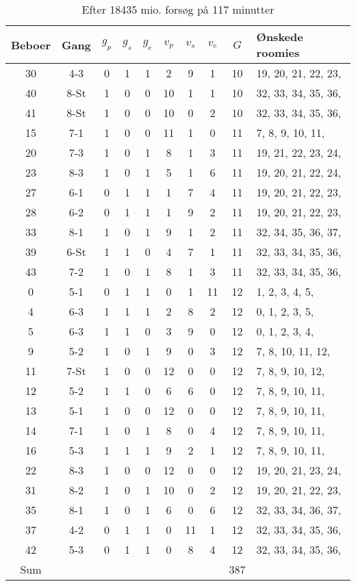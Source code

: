 \documentclass[article,oneside,11pt,a4paper]{memoir}
\newenvironment{assignment}[1]{
\begin{table}[h]
\caption{#1}
\footnotesize
\begin{center}
\begin{tabular}{cccccccccl}
\toprule
Beboer & Gang & $g_p$ & $g_s$ & $g_e$ & $v_p$ & $v_s$ & $v_e$ & $G$ & Ønskede roomies \\ \midrule
}{
\bottomrule
\end{tabular}
\end{center}
\end{table}

}
\begin{document}
\begin{assignment}{Efter 18435 mio. forsøg på 117 minutter}
    30 & 4-3  &   0 &   1 &   1 &   2 &   9 &   1 & 10 &  19, 20, 21, 22, 23, \\
    40 & 8-St &   1 &   0 &   0 &  10 &   1 &   1 & 10 &  32, 33, 34, 35, 36, \\
    41 & 8-St &   1 &   0 &   0 &  10 &   0 &   2 & 10 &  32, 33, 34, 35, 36, \\
    15 & 7-1  &   1 &   0 &   0 &  11 &   1 &   0 & 11 &   7,  8,  9, 10, 11, \\
    20 & 7-3  &   1 &   0 &   1 &   8 &   1 &   3 & 11 &  19, 21, 22, 23, 24, \\
    23 & 8-3  &   1 &   0 &   1 &   5 &   1 &   6 & 11 &  19, 20, 21, 22, 24, \\
    27 & 6-1  &   0 &   1 &   1 &   1 &   7 &   4 & 11 &  19, 20, 21, 22, 23, \\
    28 & 6-2  &   0 &   1 &   1 &   1 &   9 &   2 & 11 &  19, 20, 21, 22, 23, \\
    33 & 8-1  &   1 &   0 &   1 &   9 &   1 &   2 & 11 &  32, 34, 35, 36, 37, \\
    39 & 6-St &   1 &   1 &   0 &   4 &   7 &   1 & 11 &  32, 33, 34, 35, 36, \\
    43 & 7-2  &   1 &   0 &   1 &   8 &   1 &   3 & 11 &  32, 33, 34, 35, 36, \\
     0 & 5-1  &   0 &   1 &   1 &   0 &   1 &  11 & 12 &   1,  2,  3,  4,  5, \\
     4 & 6-3  &   1 &   1 &   1 &   2 &   8 &   2 & 12 &   0,  1,  2,  3,  5, \\
     5 & 6-3  &   1 &   1 &   0 &   3 &   9 &   0 & 12 &   0,  1,  2,  3,  4, \\
     9 & 5-2  &   1 &   0 &   1 &   9 &   0 &   3 & 12 &   7,  8, 10, 11, 12, \\
    11 & 7-St &   1 &   0 &   0 &  12 &   0 &   0 & 12 &   7,  8,  9, 10, 12, \\
    12 & 5-2  &   1 &   1 &   0 &   6 &   6 &   0 & 12 &   7,  8,  9, 10, 11, \\
    13 & 5-1  &   1 &   0 &   0 &  12 &   0 &   0 & 12 &   7,  8,  9, 10, 11, \\
    14 & 7-1  &   1 &   0 &   1 &   8 &   0 &   4 & 12 &   7,  8,  9, 10, 11, \\
    16 & 5-3  &   1 &   1 &   1 &   9 &   2 &   1 & 12 &   7,  8,  9, 10, 11, \\
    22 & 8-3  &   1 &   0 &   0 &  12 &   0 &   0 & 12 &  19, 20, 21, 23, 24, \\
    31 & 8-2  &   1 &   0 &   1 &  10 &   0 &   2 & 12 &  19, 20, 21, 22, 23, \\
    35 & 8-1  &   1 &   0 &   1 &   6 &   0 &   6 & 12 &  32, 33, 34, 36, 37, \\
    37 & 4-2  &   0 &   1 &   1 &   0 &  11 &   1 & 12 &  32, 33, 34, 35, 36, \\
    42 & 5-3  &   0 &   1 &   1 &   0 &   8 &   4 & 12 &  32, 33, 34, 35, 36, \\
Sum &&&&&&&& 387 & \\

\end{assignment}
\end{document}
